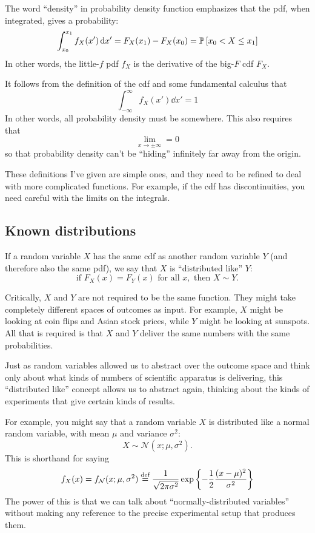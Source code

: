 The word ``density'' in probability density function emphasizes that the pdf,
when integrated, gives a probability:
\begin{equation}\label{eq:integrated_pdf}
\int_{x_0}^{x_1} f_X(x') \, \mathrm{d} x' = F_X(x_1) - F_X(x_0) = \mathbb{P}\left[{x_0 < X \leq x_1}\right]
\end{equation}
In other words, the little-$f$ pdf $f_X$ is the derivative of the big-$F$ cdf
$F_X$.

It follows from the definition of the cdf and
some fundamental calculus that
\begin{equation}
\int_{-\infty}^\infty f_X(x') \dd x' = 1
\end{equation}
In other words, all probability density must be somewhere. This also requires that
\begin{equation}
\lim_{x \to \pm \infty} = 0
\end{equation}
so that probability density can't be ``hiding'' infinitely far away from the origin.

These definitions I've given are simple ones, and they need to be refined to
deal with more complicated functions. For example, if the cdf has
discontinuities, you need careful with the limits on the integrals.

\subsection{Known distributions}

If a random variable $X$ has the same cdf as another random variable $Y$ (and
therefore also the same pdf), we say that $X$ is ``distributed like'' $Y$:
$$
\text{if } F_X(x) = F_Y(x) \text{ for all } x, \text{ then } X \sim Y.
$$

Critically, $X$ and $Y$ are not required to be the same function. They might
take completely different spaces of outcomes as input. For example, $X$ might
be looking at coin flips and Asian stock prices, while $Y$ might be looking at
sunspots. All that is required is that $X$ and $Y$ deliver the same numbers
with the same probabilities.

Just as random variables allowed us to abstract over the outcome space and
think only about what kinds of numbers of scientific apparatus is delivering,
this ``distributed like'' concept allows us to abstract again, thinking about
the kinds of experiments that give certain kinds of results.

For example, you might say that a random variable $X$ is distributed like a
normal random variable, with mean $\mu$ and variance $\sigma^2$:
$$
X \sim \mathcal{N}(x; \mu, \sigma^2).
$$
This is shorthand for saying
\begin{equation*}
f_X(x) = f_\mathcal{N}(x; \mu, \sigma^2) \stackrel{\text{def}}{=}
  \frac{1}{\sqrt{2\pi\sigma^2}} \exp \left\{-\frac{1}{2} \frac{(x-\mu)^2}{\sigma^2} \right\}
\end{equation*}
The power of this is that we can talk about ``normally-distributed variables''
without making any reference to the precise experimental setup that produces
them.

